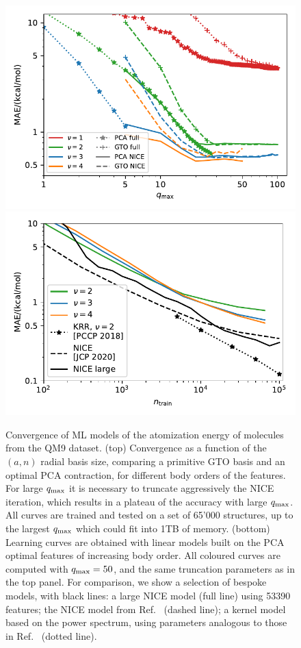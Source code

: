 \begin{figure}[btp]
    \centering
    \includegraphics[width=0.7\linewidth]{fig/optbasis/qm9-multispectrum-accuracy.pdf}
    \includegraphics[width=0.7\linewidth]{fig/optbasis/qm9-multispectrum-lc.pdf}
\caption{Convergence of ML models of the atomization energy of molecules from the QM9 dataset. (top) Convergence as a function of the $(a,n)$ radial basis size, comparing a primitive GTO basis and an optimal PCA contraction, for different body orders of the features. For large $q_\mathrm{max}$ it is necessary to truncate aggressively the NICE iteration, which results in a plateau of the accuracy with large $q_\mathrm{max}$. 
All curves are trained and tested on a set of 65'000 structures, up to the largest $q_\mathrm{max}$ which could fit into 1TB of memory. (bottom) Learning curves are obtained with linear models built on the PCA optimal features of increasing body order. All coloured curves are computed with $q_\mathrm{max}=50$, and the same truncation parameters as in the top panel. For comparison, we show a selection of bespoke models, with black lines: a large NICE model (full line) using 53390 features; the NICE model from Ref.~ (dashed line); a kernel model based on the power spectrum, using parameters analogous to those in Ref.~ (dotted line). }
\label{fig:qm9-lc}
\end{figure}

